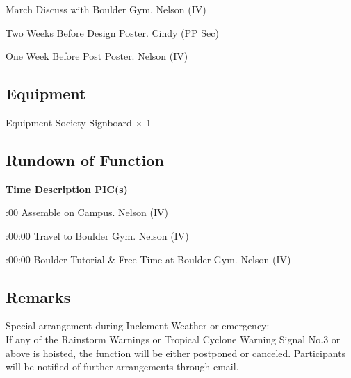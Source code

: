 \bTR{}
\eTD{} March
\eTD\bTD Discuss with Boulder Gym.
\eTD\bTD Nelson (IV)
\eTD\eTR

\bTR{}
\eTD\bTD Two Weeks Before
\eTD\bTD Design Poster.
\eTD\bTD Cindy (PP Sec)
\eTD\eTR

\bTR{}
\eTD\bTD One Week Before
\eTD\bTD Post Poster.
\eTD\bTD Nelson (IV)
\eTD\eTR

\eTABLEbody
\eTABLE

\pagebreak
\subsection{Equipment}
\starttabulate[|l|l|]
\NC{}Equipment\NC\NR
\HL
\NC Society Signboard   \NC $\times$ 1  \NR
\HL
\stoptabulate

\subsection{Rundown of Function}

\setupTABLE[c][1][width=1.25in]
\setupTABLE[c][2][width=3.5in]
\setupTABLE[c][3][width=1.25in]
\bTABLE
\bTABLEhead

\bTR\bTH    \bf{Time}
\eTH\bTH    \bf{Description}
\eTH\bTH    \bf{PIC(s)}
\eTH\eTR

\eTABLEhead
\bTABLEbody

\bTR{}:00
\eTD\bTD Assemble on Campus.
\eTD\bTD Nelson (IV)
\eTD\eTR

\bTR{}:00:00
\eTD\bTD Travel to Boulder Gym.
\eTD\bTD Nelson (IV)
\eTD\eTR

\bTR{}:00:00
\eTD\bTD Boulder Tutorial \& Free Time at Boulder Gym.
\eTD\bTD Nelson (IV)
\eTD\eTR

\eTABLEbody
\eTABLE

\subsection{Remarks}
\startitemize
\item Special arrangement during Inclement Weather or emergency: \\
If any of the Rainstorm Warnings or Tropical Cyclone Warning Signal No.3 or above is hoisted, the function will be either postponed or canceled. Participants will be notified of further arrangements through email.
\stopitemize

\pagebreak

